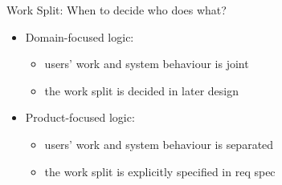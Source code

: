 \begin{Slide}{Work Split: When to decide who does what?}

\begin{itemize}
\item Domain-focused logic: 
\begin{itemize}
\item users' work and system behaviour is joint
\item the work split is decided in later design
\end{itemize}
\item Product-focused logic: 
\begin{itemize}
\item users' work and system behaviour is separated  
\item the work split is explicitly specified in req spec
 
\end{itemize}
\end{itemize}
\end{Slide}